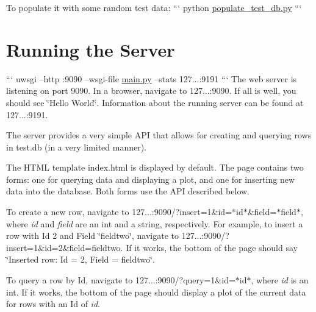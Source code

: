 To populate it with some random test data\-: ``` python \hyperlink{populate__test__db_8py}{populate\-\_\-test\-\_\-db.\-py} ```

\section*{Running the Server}

``` uwsgi --http \-:9090 --wsgi-\/file \hyperlink{main_8py}{main.\-py} --stats 127...\-:9191 ``` The web server is listening on port 9090. In a browser, navigate to 127...\-:9090. If all is well, you should see \char`\"{}\-Hello World\char`\"{}. Information about the running server can be found at 127...\-:9191.

The server provides a very simple A\-P\-I that allows for creating and querying rows in test.\-db (in a very limited manner).

The H\-T\-M\-L template index.\-html is displayed by default. The page contains two forms\-: one for querying data and displaying a plot, and one for inserting new data into the database. Both forms use the A\-P\-I described below.

To create a new row, navigate to 127...\-:9090/?insert=1\&id=$\ast$id$\ast$\&field=$\ast$field$\ast$, where {\itshape id} and {\itshape field} are an int and a string, respectively. For example, to insert a row with Id 2 and Field \char`\"{}fieldtwo\char`\"{}, navigate to 127...\-:9090/?insert=1\&id=2\&field=fieldtwo. If it works, the bottom of the page should say \char`\"{}\-Inserted row\-: Id = 2, Field =
fieldtwo\char`\"{}.

To query a row by Id, navigate to 127...\-:9090/?query=1\&id=$\ast$id$\ast$, where {\itshape id} is an int. If it works, the bottom of the page should display a plot of the current data for rows with an Id of {\itshape id}. 